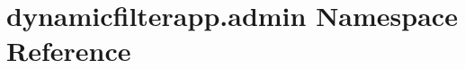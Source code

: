 \hypertarget{namespacedynamicfilterapp_1_1admin}{}\section{dynamicfilterapp.\+admin Namespace Reference}
\label{namespacedynamicfilterapp_1_1admin}
